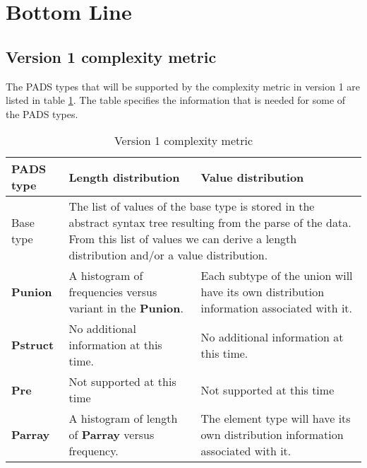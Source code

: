 \newpage
\section{Bottom Line}
\label{sec:BottomLine}

\subsection{Version 1 complexity metric}

The PADS types that will be supported by the complexity metric in
version 1 are listed in table \ref{tab:v1Complexity}. The table
specifies the information that is needed for some of the PADS types.

\begin{longtable}{||l|l|l|}
\caption[Version 1 complexity metric]{Version 1 complexity metric}
\label{tab:v1Complexity}
\\\hline
\hline
PADS type & Length distribution & Value distribution \\\hline\hline

Base type &
\multicolumn{2}{l}{
The list of values of the base type is stored in the abstract
syntax tree resulting from the parse of the data. From this
list of values we can derive a length distribution and/or
a value distribution.
\vspace{0.5mm}} \\\hline

\textbf{Punion} &
\parbox[t]{5cm}{
A histogram of frequencies versus variant in the \textbf{Punion}.
\vspace{0.5mm}} &
\parbox[t]{6cm}{
Each subtype of the union will have its own distribution information
associated with it.
\vspace{0.5mm}} \\\hline

\textbf{Pstruct} &
\parbox[t]{5cm}{
No additional information at this time.
\vspace{0.5mm}} &
\parbox[t]{6cm}{
No additional information at this time.
\vspace{0.5mm}} \\\hline

\textbf{Pre} &
\parbox[t]{5cm}{
Not supported at this time
\vspace{0.5mm}} &
\parbox[t]{6cm}{
Not supported at this time
\vspace{0.5mm}} \\\hline

\textbf{Parray} &
\parbox[t]{5cm}{
A histogram of length of \textbf{Parray} versus frequency.
\vspace{0.5mm}} &
\parbox[t]{6cm}{
The element type will have its own distribution information
associated with it.
\vspace{0.5mm}}

\\\hline
\end{longtable}
